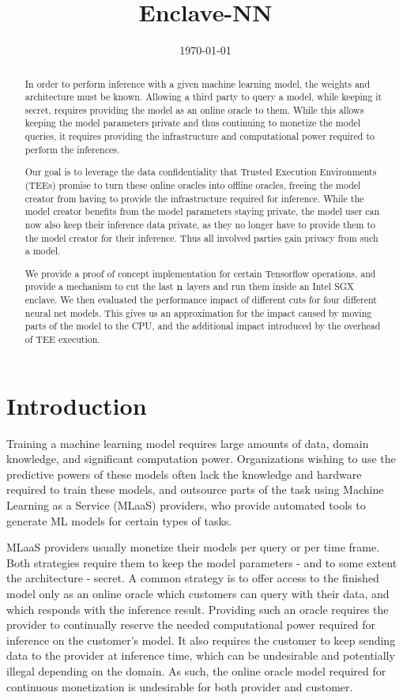 \documentclass[11pt]{article}
\date{\today}
\title{Enclave-NN}
\begin{document}
\maketitle
\tableofcontents

\begin{abstract}
In order to perform inference with a given machine learning model, the weights and architecture must be known.
Allowing a third party to query a model, while keeping it secret, requires providing the model as an online oracle to them.
While this allows keeping the model parameters private and thus continuing to monetize the model queries, it requires providing the infrastructure and computational power required to perform the inferences.

Our goal is to leverage the data confidentiality that Trusted Execution Environments (TEEs) promise to turn these online oracles into offline oracles, freeing the model creator from having to provide the infrastructure required for inference.
While the model creator benefits from the model parameters staying private, the model user can now also keep their inference data private, as they no longer have to provide them to the model creator for their inference.
Thus all involved parties gain privacy from such a model.

We provide a proof of concept implementation for certain Tensorflow operations, and provide a mechanism to cut the last \($n$\) layers and run them inside an Intel SGX enclave.
We then evaluated the performance impact of different cuts for four different neural net models.
This gives us an approximation for the impact caused by moving parts of the model to the CPU, and the additional impact introduced by the overhead of TEE execution.
\end{abstract}

\section{Introduction}
\label{sec:introduction}

Training a machine learning model requires large amounts of data, domain knowledge, and significant computation power.
Organizations wishing to use the predictive powers of these models often lack the knowledge and hardware required to train these models, and outsource parts of the task using Machine Learning as a Service (MLaaS) providers, who provide automated tools to generate ML models for certain types of tasks.

MLaaS providers usually monetize their models per query or per time frame.
Both strategies require them to keep the model parameters - and to some extent the architecture - secret.
A common strategy is to offer access to the finished model only as an online oracle which customers can query with their data, and which responds with the inference result.
Providing such an oracle requires the provider to continually reserve the needed computational power required for inference on the customer's model.
It also requires the customer to keep sending data to the provider at inference time, which can be undesirable and potentially illegal depending on the domain.
As such, the online oracle model required for continuous monetization is undesirable for both provider and customer.
\end{document}
